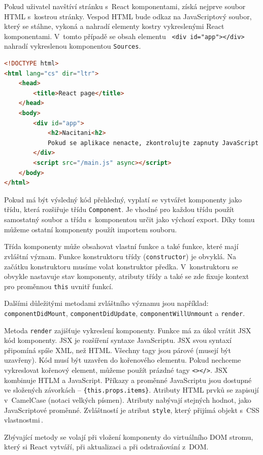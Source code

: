 Pokud uživatel navštíví stránku s~React komponentami, získá nejprve soubor HTML s~kostrou stránky. Vespod HTML bude odkaz na JavaScriptový soubor, který se stáhne, vykoná a nahradí elementy kostry vykreslenými React komponentami. V~tomto případě se obsah elementu \texttt{ <div id="{}app"{}></div>} nahradí vykreslenou komponentou \texttt{Sources}.
\begin{lstlisting}[language=HTML]
<!DOCTYPE html>
<html lang="cs" dir="ltr">
    <head>
        <title>React page</title>
    </head>
    <body>
        <div id="app">
            <h2>Nacitani<h2>
            Pokud se aplikace nenacte, zkontrolujte zapnuty JavaScript
        </div>
        <script src="/main.js" async></script>
    </body>
</html>
\end{lstlisting}

Pokud má být výsledný kód přehledný, vyplatí se vytvářet komponenty jako třídu, která rozšiřuje třídu \texttt{Component}. Je vhodné pro každou třídu použít samostatný soubor a třídu s~komponentou určit jako výchozí export. Díky tomu můžeme ostatní komponenty použít importem souboru.

Třída komponenty může obsahovat vlastní funkce a také funkce, které mají zvláštní význam. Funkce konstruktoru třídy (\texttt{constructor}) je obvyklá. Na začátku konstruktoru musíme volat konstruktor předka. V~konstruktoru se obvykle nastavuje stav komponenty, atributy třídy a také se zde fixuje kontext pro proměnnou \texttt{this} uvnitř funkcí.

Dalšími důležitými metodami zvláštního významu jsou například: \texttt{componentDidMount}, \texttt{componentDidUpdate}, \texttt{componentWillUnmount} a \texttt{render}.

Metoda \texttt{render} zajišťuje vykreslení komponenty. Funkce má za úkol vrátit JSX kód komponenty. JSX je rozšíření syntaxe JavaScriptu. JSX svou syntaxí připomíná spíše XML, než HTML. Všechny tagy jsou párové (musejí být uzavřeny). Kód musí být uzavřen do kořenového elementu. Pokud nechceme vykreslovat kořenový element, můžeme použít prázdné tagy \texttt{<></>}. JSX kombinuje HTLM a JavaScript. Příkazy a proměnné JavaScriptu jsou dostupné ve složených závorkách -- \texttt{\{this.props.items\}}. Atributy HTML prvků se zapisují v~CamelCase (notaci velkých písmen). Atributy nabývají stejných hodnot, jako JavaScriptové proměnné. Zvláštností je atribut \texttt{style}, který přijímá objekt s~CSS vlastnostmi\,\cite{jsx}.

Zbývající metody se volají při vložení komponenty do virtuálního DOM stromu, který si React vytváří, při aktualizaci a při odstraňování z~DOM.

